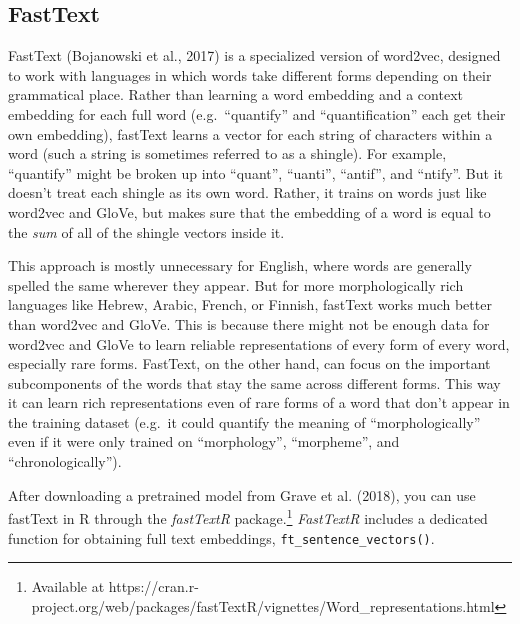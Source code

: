 \documentclass[
  man,
  floatsintext,
  longtable,
  nolmodern,
  notxfonts,
  notimes,
  colorlinks=true,linkcolor=blue,citecolor=blue,urlcolor=blue]{apa7}
\begin{document}
\subsection{FastText}\label{fasttext}

FastText (Bojanowski et al., 2017) is a specialized version of word2vec,
designed to work with languages in which words take different forms
depending on their grammatical place. Rather than learning a word
embedding and a context embedding for each full word (e.g.~``quantify''
and ``quantification'' each get their own embedding), fastText learns a
vector for each string of characters within a word (such a string is
sometimes referred to as a shingle). For example, ``quantify'' might be
broken up into ``quant'', ``uanti'', ``antif'', and ``ntify''. But it
doesn't treat each shingle as its own word. Rather, it trains on words
just like word2vec and GloVe, but makes sure that the embedding of a
word is equal to the \emph{sum} of all of the shingle vectors inside it.

This approach is mostly unnecessary for English, where words are
generally spelled the same wherever they appear. But for more
morphologically rich languages like Hebrew, Arabic, French, or Finnish,
fastText works much better than word2vec and GloVe. This is because
there might not be enough data for word2vec and GloVe to learn reliable
representations of every form of every word, especially rare forms.
FastText, on the other hand, can focus on the important subcomponents of
the words that stay the same across different forms. This way it can
learn rich representations even of rare forms of a word that don't
appear in the training dataset (e.g.~it could quantify the meaning of
``morphologically'' even if it were only trained on ``morphology'',
``morpheme'', and ``chronologically'').

After downloading a pretrained model from Grave et al. (2018), you can
use fastText in R through the \emph{fastTextR} package.\footnote{Available
  at
  https://cran.r-project.org/web/packages/fastTextR/vignettes/Word\_representations.html}
\emph{FastTextR} includes a dedicated function for obtaining full text
embeddings, \texttt{ft\_sentence\_vectors()}.
\end{document}
